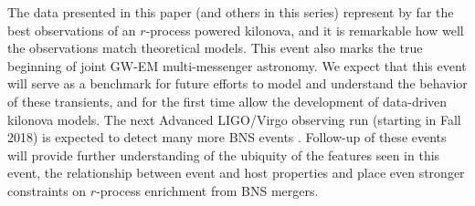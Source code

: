 \clearpage
The data presented in this paper (and others in this series) represent by far the best observations of an $r$-process powered kilonova, and it is remarkable how well the observations match theoretical models.  This event also marks the true beginning of joint GW-EM multi-messenger astronomy.  We expect that this event will serve as a benchmark for future efforts to model and understand the behavior of these transients, and for the first time allow the development of data-driven kilonova models. The next Advanced LIGO/Virgo observing run (starting in Fall 2018) is expected to detect many more BNS events \citep{LIGOLocalization}. Follow-up of these events will provide further understanding of the ubiquity of the features seen in this event, the relationship between event and host properties and place even stronger constraints on $r$-process enrichment from BNS mergers.

